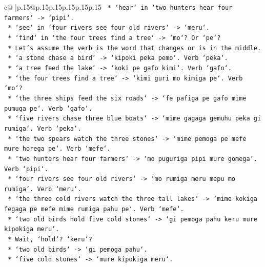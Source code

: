 \documentclass{article}
\begin{document}
{\begin{supertabular}{c@{$\;$}|p{.15\linewidth}@{}p{.15\linewidth}p{.15\linewidth}p{.15\linewidth}p{.15\linewidth}p{.15\linewidth}}
{{{\texttt{                            *   `hear` in `two hunters hear four farmers` {-}> `pipi`.} \\
\texttt{                            *   `see` in `four rivers see four old rivers` {-}> `meru`.} \\
\texttt{                            *   `find` in `the four trees find a tree` {-}> `mo`? Or `pe`?} \\
\texttt{                            *   Let's assume the verb is the word that changes or is in the middle.} \\
\texttt{                            *   `a stone chase a bird` {-}> `kipoki peka pemo`. Verb `peka`.} \\
\texttt{                            *   `a tree feed the lake` {-}> `koki pe gafo kimi`. Verb `gafo`.} \\
\texttt{                            *   `the four trees find a tree` {-}> `kimi guri mo kimiga pe`. Verb `mo`?} \\
\texttt{                            *   `the three ships feed the six roads` {-}> `fe pafiga pe gafo mime pumuga pe`. Verb `gafo`.} \\
\texttt{                            *   `five rivers chase three blue boats` {-}> `mime gagaga gemuhu peka gi rumiga`. Verb `peka`.} \\
\texttt{                            *   `the two spears watch the three stones` {-}> `mime pemoga pe mefe mure horega pe`. Verb `mefe`.} \\
\texttt{                            *   `two hunters hear four farmers` {-}> `mo puguriga pipi mure gomega`. Verb `pipi`.} \\
\texttt{                            *   `four rivers see four old rivers` {-}> `mo rumiga meru mepu mo rumiga`. Verb `meru`.} \\
\texttt{                            *   `the three cold rivers watch the three tall lakes` {-}> `mime kokiga fegaga pe mefe mime rumiga pahu pe`. Verb `mefe`.} \\
\texttt{                            *   `two old birds hold five cold stones` {-}> `gi pemoga pahu keru mure kipokiga meru`.} \\
\texttt{                                *   Wait, `hold`? `keru`?} \\
\texttt{                                *   `two old birds` {-}> `gi pemoga pahu`.} \\
\texttt{                                *   `five cold stones` {-}> `mure kipokiga meru`.} \\
}}}
\end{supertabular}}
\end{document}
